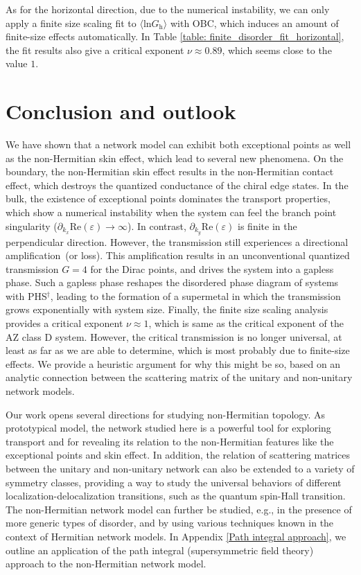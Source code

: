 \documentclass[aps,pra,reprint,superscriptaddress,showkeys,amsmath,amssymb,longbibliography]{revtex4-1}
\begin{document}
As for the horizontal direction, due to the numerical instability, we can only apply a finite size scaling fit to $\langle\text{ln}G_{\text{h}}\rangle$ with OBC, which induces an amount of finite-size effects automatically.
In Table \ref{table: finite_disorder_fit_horizontal}, the fit results also give a critical exponent $\nu\approx 0.89$, which seems close to the value $1$.

\section{Conclusion and outlook}
\label{sec:conclusion}

We have shown that a network model can exhibit both exceptional points as well as the non-Hermitian skin effect, which lead to several new phenomena.
On the boundary, the non-Hermitian skin effect results in the non-Hermitian contact effect, which destroys the quantized conductance of the chiral edge states.
In the bulk, the existence of exceptional points dominates the transport properties, which show a numerical instability when the system can feel the branch point singularity ($\partial_{k_x}\text{Re}(\varepsilon)\rightarrow \infty$). 
In contrast, $\partial_{k_y}\text{Re}(\varepsilon)$ is finite in the perpendicular direction. 
However, the transmission still experiences a directional amplification~(or loss).
This amplification results in an unconventional quantized transmission $G=4$ for the Dirac points, and drives the system into a gapless phase.
Such a gapless phase reshapes the disordered phase diagram of systems with PHS$^\dagger$, leading to the formation of a supermetal in which the transmission grows exponentially with system size.
Finally, the finite size scaling analysis provides a critical exponent $\nu\approx 1$, which is same as the critical exponent of the AZ class D system.
However, the critical transmission is no longer universal, at least as far as we are able to determine, which is most probably due to finite-size effects.
We provide a heuristic argument for why this might be so, based on an analytic connection between the scattering matrix of the unitary and non-unitary network models.

Our work opens several directions for studying non-Hermitian topology.
As prototypical model, the network studied here is a powerful tool for exploring transport and for revealing its relation to the non-Hermitian features like the exceptional points and skin effect.
In addition, the relation of scattering matrices between the unitary and non-unitary network can also be extended to a variety of symmetry classes, providing a way to study the universal behaviors of different localization-delocalization transitions, such as the quantum spin-Hall transition.
The non-Hermitian network model can further be studied, e.g., in the presence of more generic types of disorder, and by using various techniques known in the context of Hermitian network models.
In Appendix \ref{Path integral approach}, we outline an application of the path integral (supersymmetric field theory) approach to the non-Hermitian network model.
\end{document}
